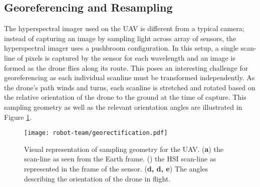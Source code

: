 \subsection{Georeferencing and Resampling}

The hyperspectral imager used on the UAV is different from a typical camera;
instead of capturing an image by sampling light across array of sensors, the
hyperspectral imager uses a pushbroom configuration. In this setup, a single
scan-line of pixels is captured by the sensor for each wavelength and an image
is formed as the drone flies along its route. This poses an interesting
challenge for georeferencing as each individual scanline must be transformed
independently. As the drone's path winds and turns, each scanline
is stretched and rotated based on the relative orientation of
the drone to the ground at the time of capture. This sampling geometry as well
as the relevant orientation angles are illustrated in Figure
\ref{fig:georectification}.

\begin{figure}[h]
  \centering
  \texttt{[image: robot-team/georectification.pdf]}
  \caption{Visual representation of sampling geometry for the UAV. (\textbf{a})
    the scan-line as seen from the Earth frame. () the HSI scan-line as
    represented in the frame of the sensor. (\textbf{d, d, e}) The angles
    describing the orientation of the drone in flight.}
  \label{fig:georectification}
\end{figure}

